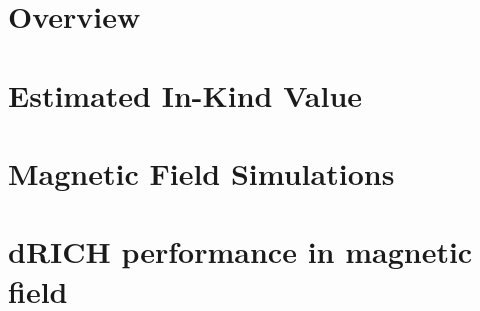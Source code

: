 \documentclass[12pt,twoside]{article}
\begin{document}
\linenumbers
\pagestyle{empty}




\setcounter{page}{1}



\tableofcontents
\clearpage


\renewcommand{\thepage}{\arabic{page}}



\section {Overview}
\label{overview}
 
%

\section {Estimated In-Kind Value}
\label{costing}


\section {Magnetic Field Simulations}
\label{simulations}


\section {dRICH performance in magnetic field}
\label{dRICH}


\listoftodos[To Do]



\end{document}
